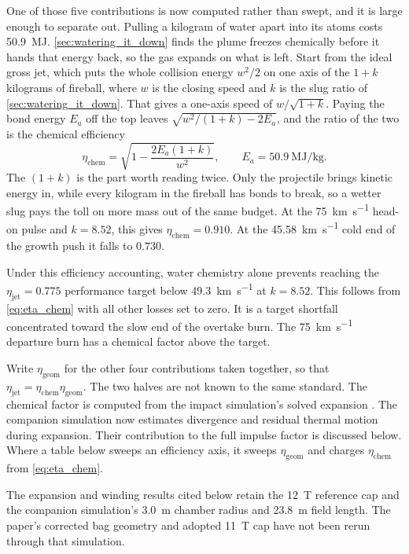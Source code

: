 \documentclass{article}
\begin{document}
One of those five contributions is now computed rather than swept, and it is large enough to separate out. Pulling a kilogram of water apart into its atoms costs \SI{50.9}{\mega\joule}. \autoref{sec:watering_it_down} finds the plume freezes chemically before it hands that energy back, so the gas expands on what is left. Start from the ideal gross jet, which puts the whole collision energy $w^2/2$ on one axis of the $1+k$ kilograms of fireball, where $w$ is the closing speed and $k$ is the slug ratio of \autoref{sec:watering_it_down}. That gives a one-axis speed of $w/\sqrt{1+k}$. Paying the bond energy $E_a$ off the top leaves $\sqrt{w^2/(1+k) - 2E_a}$, and the ratio of the two is the chemical efficiency
\begin{equation}
\eta_{\mathrm{chem}} = \sqrt{1 - \frac{2E_a(1+k)}{w^2}}, \qquad E_a = \SI{50.9}{\mega\joule\per\kilogram}.
\label{eq:eta_chem}
\end{equation}
The $(1+k)$ is the part worth reading twice. Only the projectile brings kinetic energy in, while every kilogram in the fireball has bonds to break, so a wetter slug pays the toll on more mass out of the same budget. At the \SI{75}{\kilo\meter\per\second} head-on pulse and $k = 8.52$, this gives $\eta_{\mathrm{chem}} = 0.910$. At the \SI{45.58}{\kilo\meter\per\second} cold end of the growth push it falls to $0.730$.

Under this efficiency accounting, water chemistry alone prevents reaching the $\eta_{\mathrm{jet}} = 0.775$ performance target below \SI{49.3}{\kilo\meter\per\second} at $k = 8.52$. This follows from \autoref{eq:eta_chem} with all other losses set to zero. It is a target shortfall concentrated toward the slow end of the overtake burn. The \SI{75}{\kilo\meter\per\second} departure burn has a chemical factor above the target.

Write $\eta_{\mathrm{geom}}$ for the other four contributions taken together, so that $\eta_{\mathrm{jet}} = \eta_{\mathrm{chem}}\eta_{\mathrm{geom}}$. The two halves are not known to the same standard. The chemical factor is computed from the impact simulation's solved expansion \cite{Katz_puffsat_impact_sim_2026}. The companion simulation now estimates divergence and residual thermal motion during expansion. Their contribution to the full impulse factor is discussed below. Where a table below sweeps an efficiency axis, it sweeps $\eta_{\mathrm{geom}}$ and charges $\eta_{\mathrm{chem}}$ from \autoref{eq:eta_chem}.

The expansion and winding results cited below retain the \SI{12}{\tesla} reference cap and the companion simulation's \SI{3.0}{\meter} chamber radius and \SI{23.8}{\meter} field length. The paper's corrected bag geometry and adopted \SI{11}{\tesla} cap have not been rerun through that simulation.
\end{document}
